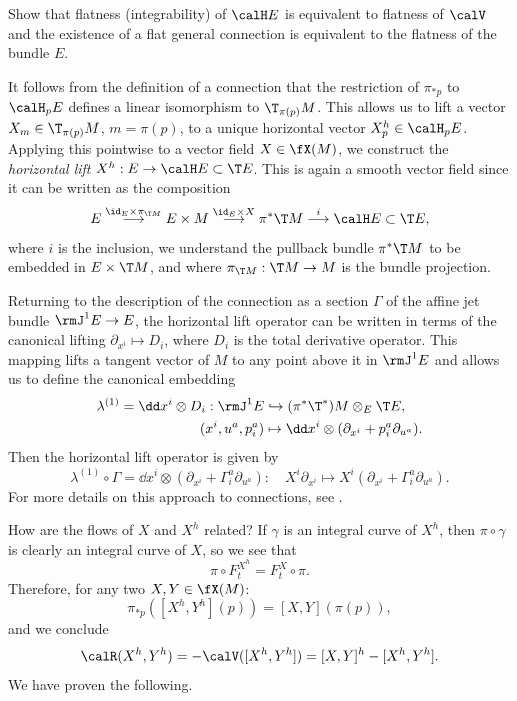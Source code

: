 \begin{xca}
    Show that flatness (integrability) of $\calH E$ is equivalent to flatness of $\calV$ and the existence of a flat general connection is equivalent to the flatness of the bundle $E$.
\end{xca}

It follows from the definition of a connection that the restriction of $\pi_{\ast p}$ to $\calH_pE$ defines a linear isomorphism to $\T_{\pi(p)}M$.
This allows us to lift a vector $X_m\in \T_{\pi(p)}M$, $m=\pi(p)$, to a unique horizontal vector $X_p^h\in \calH_pE$. Applying this pointwise to a vector field $X\in\fX(M)$, we construct the \emph{horizontal lift} $X^h:E\to \calH E\subset \T E$. This is again a smooth vector field since it can be written as the composition
\[E\overset{\id_E\times \pi_{\T M}}{\longrightarrow}E\times M \overset{\id_E\times X}{\longrightarrow}\pi^\ast \T M \overset{i}{\longrightarrow}\calH E\subset \T E,\]
where $i$ is the inclusion, we understand the pullback bundle $\pi^\ast \T M$ to be embedded in $E\times \T M$, and where $\pi_{\T M}:\T M\to M$ is the bundle projection.

\begin{rem}\label{rem connections via jets 3}
    Returning to the description of the connection as a section $\varGamma$ of the affine jet bundle $\rmJ^1 E\to E$, the horizontal lift operator can be written in terms of the canonical lifting $\partial_{x^i}\mapsto D_i$, where $D_i$ is the total derivative operator. This mapping lifts a tangent vector of $M$ to any point above it in $\rmJ^1 E$ and allows us to define the canonical embedding 
    \begin{align}
        \lambda^{(1)}=\dd x^i\otimes D_i:\rmJ^1 E&\hookrightarrow (\pi^\ast\T^\ast) M\otimes_E \T E,\\ 
        (x^i,u^a,p^a_i)&\mapsto \dd x^i\otimes (\partial_{x^i}+p^a_i\partial_{u^a}).
    \end{align}
    Then the horizontal lift operator is given by
    \[\lambda^{(1)}\circ\varGamma=\dd x^i\otimes(\partial_{x^i}+\varGamma^a_i\partial_{u^a}):\quad X^i\partial_{x^i}\mapsto X^i(\partial_{x^i}+\varGamma^a_i\partial_{u^a}).\]
    For more details on this approach to connections, see \cite{Giachetta}.
\end{rem}

How are the flows of $X$ and $X^h$ related? If $\gamma$ is an integral curve of $X^h$, then $\pi\circ\gamma$ is clearly an integral curve of $X$, so we see that 
\[\pi\circ F^{X^h}_t=F^{X}_t\circ \pi.\]
Therefore, for any two $X,Y\in \fX(M)$:
\[\pi_{\ast p}([X^h,Y^h](p))=[X,Y](\pi(p)),\]
and we conclude
\[\calR(X^h,Y^h)=-\calV([X^h,Y^h])=[X,Y]^h-[X^h,Y^h].\]
We have proven the following.

